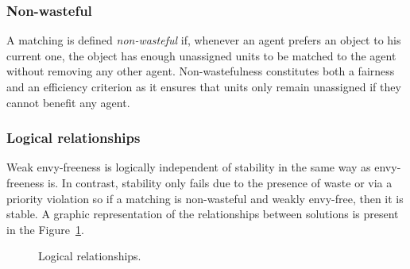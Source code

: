 \subsubsection{Non-wasteful}%

A matching is defined \textit{non-wasteful} if, whenever an agent prefers an object to his current one, the object has enough unassigned units to be matched to the agent without removing any other agent. Non-wastefulness constitutes both a fairness and an efficiency criterion as it ensures that units only remain unassigned if they cannot benefit any agent.


\subsubsection{Logical relationships}%

Weak envy-freeness is logically independent of stability in the same way as envy-freeness is. In contrast, stability only fails due to the presence of waste or via a priority violation so if a matching is non-wasteful and weakly envy-free, then it is stable. A graphic representation of the relationships between solutions is present in the Figure~\ref{fig:matching}.

\begin{figure}[!htb]
    \def\svgwidth{\columnwidth}
    
    \caption{Logical relationships.}
    \label{fig:matching}
\end{figure}
